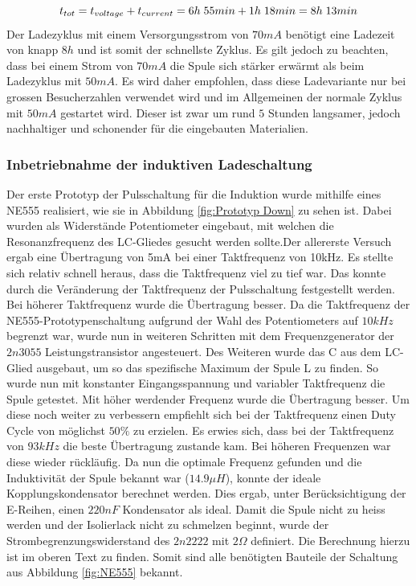 \begin{equation}
\centering
t_{tot}=t_{voltage}+t_{current}=6h\thickspace 55min + 1h\thickspace 18min = 8h\thickspace 13min
\label{eq:SchnellGesamt}
\end{equation}
Der Ladezyklus mit einem Versorgungsstrom von $70mA$ benötigt eine Ladezeit von knapp $8h$ und ist somit der schnellste Zyklus. Es gilt jedoch zu beachten, dass bei einem Strom von $70mA$ die Spule sich stärker erwärmt als beim Ladezyklus mit $50mA$. Es wird daher empfohlen, dass diese Ladevariante nur bei grossen Besucherzahlen verwendet wird und im Allgemeinen der normale Zyklus mit $50mA$ gestartet wird. Dieser ist zwar um rund $5$ Stunden langsamer, jedoch nachhaltiger und schonender für die eingebauten Materialien.

\subsubsection*{Inbetriebnahme der induktiven Ladeschaltung}\label{sec:erkenntnisse}

Der erste Prototyp der Pulsschaltung für die Induktion wurde mithilfe eines NE555 realisiert, wie sie in Abbildung \ref{fig:Prototyp Down} zu sehen ist. Dabei wurden als Widerstände Potentiometer eingebaut, mit welchen die Resonanzfrequenz des LC-Gliedes gesucht werden sollte.Der allererste Versuch ergab eine Übertragung von 5mA bei einer Taktfrequenz von 10kHz. Es stellte sich relativ schnell heraus, dass die Taktfrequenz viel zu tief war. Das konnte durch die Veränderung der Taktfrequenz der Pulsschaltung festgestellt werden. Bei höherer Taktfrequenz wurde die Übertragung besser. Da die Taktfrequenz der NE555-Prototypenschaltung aufgrund der Wahl des Potentiometers auf $10kHz$ begrenzt war, wurde nun in weiteren Schritten mit dem Frequenzgenerator der $2n3055$ Leistungstransistor angesteuert. Des Weiteren wurde das C aus dem LC-Glied ausgebaut, um so das spezifische Maximum der Spule L zu finden. So wurde nun mit konstanter Eingangsspannung und variabler Taktfrequenz die Spule getestet. Mit höher werdender Frequenz wurde die Übertragung besser. Um diese noch weiter zu verbessern empfiehlt sich bei der Taktfrequenz einen Duty Cycle von möglichst $50\%$ zu erzielen. Es erwies sich, dass bei der Taktfrequenz von $93kHz$ die beste Übertragung zustande kam. Bei höheren Frequenzen war diese wieder rückläufig. Da nun die optimale Frequenz gefunden und die Induktivität der Spule bekannt war ($14.9\mu H$), konnte der ideale Kopplungskondensator berechnet werden. Dies ergab, unter Berücksichtigung der E-Reihen, einen $220nF$ Kondensator als ideal. Damit die Spule nicht zu heiss werden und der Isolierlack nicht zu schmelzen beginnt, wurde der Strombegrenzungswiderstand des $2n2222$ mit $2\Omega$ definiert. Die Berechnung hierzu ist im oberen Text zu finden. Somit sind alle benötigten Bauteile der Schaltung aus Abbildung \ref{fig:NE555} bekannt.

